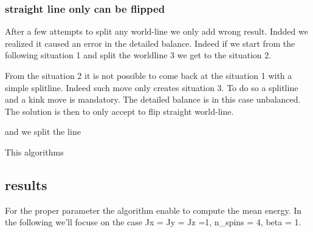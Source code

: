\documentclass[a4paper,12pt,twoside]{article}
\begin{document}
	\subsubsection{straight line only can be flipped}
	After a few attempts to split any world-line we only add wrong result. Indded we realized it caused an error in the detailed balance.
	Indeed if we start from the following situation 1 and split the worldline 3 we get to the situation 2.
	
	From the situation 2 it is not possible to come back at the situation 1 with a simple splitline. Indeed such move only creates situation 3. To do so a splitline and a kink move is mandatory. The detailed balance is in this case unbalanced.
	The solution is then to only accept to flip straight world-line. 
	
	and we split the line 
	

	This algorithms 
	\subsection{results}
	For the proper parameter the algorithm enable to compute the mean energy. In the following we'll focuse on the case Jx = Jy = Jz =1, n_spins = 4, beta = 1.
\end{document}
